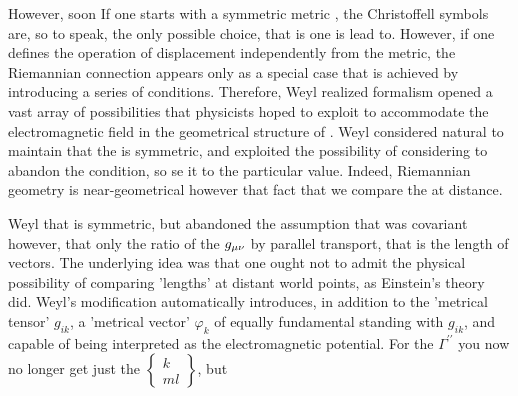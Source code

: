 \documentclass[draft]{article}
\begin{document}
{However, soon If one starts with a symmetric metric \gmn, the Christoffell symbols are, so to speak, the only possible choice, that is one is lead to. However, if one defines the operation of displacement independently from the metric, the Riemannian connection appears only as a special case that is achieved by introducing a series of conditions. Therefore, Weyl realized formalism opened a vast array of possibilities that physicists hoped to exploit to accommodate the electromagnetic field in the geometrical structure of \spti. Weyl considered natural to maintain that the is symmetric, and exploited the possibility of considering to abandon the condition, so se it to the particular value. Indeed, Riemannian geometry is near-geometrical however that fact that we compare the at distance. 



Weyl that is symmetric, but abandoned the assumption that was covariant however, that only the ratio of the $g_{\mu\nu}$ by parallel transport, that is the length of vectors. The underlying idea was that one ought not to admit the physical possibility of comparing 'lengths' at distant world points, as Einstein's theory did. Weyl's modification automatically introduces, in addition to the 'metrical tensor' $g_{i k}$, a 'metrical vector' $\varphi_{k}$ of equally fundamental standing with $g_{i k}$, and capable of being interpreted as the electromagnetic potential. For the $\Gamma^{\prime \prime}$ you now no longer get just the $\left\{\begin{array}{c}k \\ m l\end{array}\right\}$, but

}
\end{document}
